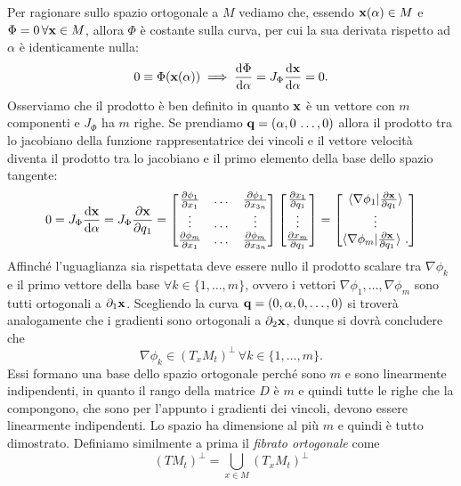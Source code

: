     Per ragionare sullo spazio ortogonale a $M$ vediamo che, essendo $\mathbf{x}(\alpha) \in M$ e $\Phi=0\, \forall \mathbf{x} \in M$, allora $\Phi$ è costante sulla curva, per cui la sua derivata rispetto ad $\alpha$ è identicamente nulla:
    \begin{equation}
        0 \equiv \Phi(\mathbf{x}(\alpha)) \implies \frac{\mathrm{d} \Phi}{\mathrm{d} \alpha} = J_\Phi \frac{\mathrm{d} \mathbf{x}}{\mathrm{d} \alpha} = 0 .
    \end{equation}
    Osserviamo che il prodotto è ben definito in quanto $\mathbf{x}$ è un vettore con $m$ componenti e $J_\Phi$ ha $m$ righe.
    Se prendiamo $\mathbf{q} = (\alpha,0\,\dots, 0)$ allora il prodotto tra lo jacobiano della funzione rappresentatrice dei vincoli e il vettore velocità diventa il prodotto tra lo jacobiano e il primo elemento della base dello spazio tangente:
   \begin{equation}
       0 = J_\Phi \frac{\mathrm{d} \mathbf{x}}{\mathrm{d} \alpha} = J_\Phi \frac{\partial \mathbf{x}}{\partial q_1} = \begin{bmatrix}
           \frac{\partial \phi_1}{\partial x_1}&\dots& \frac{\partial \phi_1}{\partial x_{3n}}\\
            \vdots&\dots&\vdots\\
            \frac{\partial \phi_m}{\partial x_1}&\dots&\frac{\partial \phi_m}{\partial x_{3n}}            
       \end{bmatrix}
       \begin{bmatrix}
           \frac{\partial x_1}{\partial q_1}\\
           \vdots\\
           \frac{\partial x_m}{\partial q_1}
       \end{bmatrix} = \begin{bmatrix}
           \braket{\nabla\phi_1 |\frac{\partial \mathbf{x}}{\partial q_1}}\\
           \vdots \\
        \braket{\nabla \phi_m |\frac{\partial \mathbf{x}}{\partial q_1}}\,.
       \end{bmatrix}
   \end{equation}
    Affinché l'uguaglianza sia rispettata deve essere nullo il prodotto scalare tra $\nabla \phi_k$ e il primo vettore della base $\forall k \in \{1,\dots,m\}$, ovvero i vettori $\nabla \phi_1, \dots, \nabla \phi_m$ sono tutti ortogonali a $\partial_1 \mathbf{x}$. Scegliendo la curva $\mathbf{q} = (0, \alpha,0,\dots,0)$ si troverà analogamente che i gradienti sono ortogonali a $\partial_2 \mathbf{x}$, dunque si dovrà concludere che
    \begin{equation}
        \nabla \phi_k \in (T_xM_t)^\perp \,\forall k \in \{1,\dots,m\}.
    \end{equation}
    Essi formano una base dello spazio ortogonale perché sono $m$ e sono linearmente indipendenti, in quanto il rango della matrice $D$ è $m$ e quindi tutte le righe che la compongono, che sono per l'appunto i gradienti dei vincoli, devono essere linearmente indipendenti. Lo spazio ha dimensione al più $m$ e quindi è tutto dimostrato. Definiamo similmente a prima il \emph{fibrato ortogonale} come 
    \begin{equation}
        (TM_t)^\perp = \bigcup_{x\in M} (T_xM_t)^\perp
    \end{equation}
    
